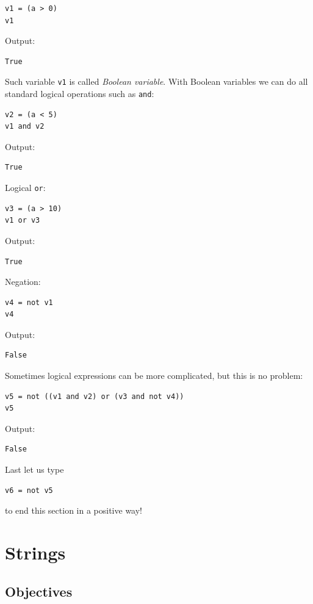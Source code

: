 \begin{verbatim}
v1 = (a > 0)
v1
\end{verbatim}
Output:

\begin{verbatim}
True
\end{verbatim}
Such variable {\tt v1} is called {\em Boolean variable}. With Boolean variables we can do all standard 
logical operations such as {\tt and}:

\begin{verbatim}
v2 = (a < 5)
v1 and v2
\end{verbatim}
Output:

\begin{verbatim}
True
\end{verbatim}
Logical {\tt or}:

\begin{verbatim}
v3 = (a > 10)
v1 or v3
\end{verbatim}
Output:

\begin{verbatim}
True
\end{verbatim}
Negation:

\begin{verbatim}
v4 = not v1
v4
\end{verbatim}
Output:

\begin{verbatim}
False
\end{verbatim}
Sometimes logical expressions can be more complicated, but this is no problem:

\begin{verbatim}
v5 = not ((v1 and v2) or (v3 and not v4))
v5
\end{verbatim}
Output:

\begin{verbatim}
False
\end{verbatim}
Last let us type

\begin{verbatim}
v6 = not v5
\end{verbatim}
to end this section in a positive way!

\section{Strings}

\subsection{Objectives}

